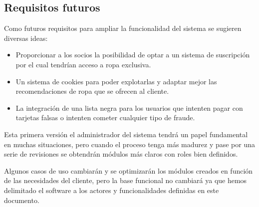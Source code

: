 \subsection{Requisitos futuros}
Como futuros requisitos para ampliar la funcionalidad del sistema se sugieren diversas ideas:
\begin{itemize}
    \item Proporcionar a los socios la posibilidad de optar a un sistema de suscripción por el cual tendrían acceso a ropa exclusiva.
    \item Un sistema de cookies para poder explotarlas y adaptar mejor las recomendaciones de ropa que se ofrecen al cliente.
    \item La integración de una lista negra para los usuarios que intenten pagar con tarjetas falsas o intenten cometer cualquier tipo de fraude.
\end{itemize}

Esta primera versión el administrador del sistema tendrá un papel fundamental en
muchas situaciones, pero cuando el proceso tenga más madurez y pase por una serie
de revisiones se obtendrán módulos más claros con roles bien definidos.

Algunos casos de uso cambiarán y se optimizarán los módulos creados en función de
las necesidades del cliente, pero la base funcional no cambiará ya que hemos
delimitado el software a los actores y funcionalidades definidas en este documento.
